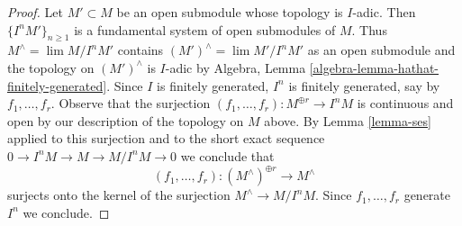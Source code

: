 \documentclass{stacks-project}
\theoremstyle{plain}
\theoremstyle{definition}
\theoremstyle{remark}
\numberwithin{equation}{subsection}
\def\lim{\mathop{\mathrm{lim}}\nolimits}
\begin{document}
\begin{proof}
Let $M' \subset M$ be an open submodule whose topology is $I$-adic.
Then $\{I^nM'\}_{n \geq 1}$ is a fundamental system of open submodules
of $M$. Thus $M^\wedge = \lim M/I^nM'$ contains
$(M')^\wedge = \lim M'/I^nM'$
as an open submodule and the topology on $(M')^\wedge$ is
$I$-adic by Algebra, Lemma \ref{algebra-lemma-hathat-finitely-generated}.
Since $I$ is finitely generated, $I^n$ is finitely generated,
say by $f_1, \ldots, f_r$. Observe that the surjection
$(f_1, \ldots, f_r) : M^{\oplus r} \to I^n M$ is continuous
and open by our description of the topology on $M$ above.
By Lemma \ref{lemma-ses} applied to this surjection and to the
short exact sequence $0 \to I^nM \to M \to M/I^nM \to 0$
we conclude that
$$
(f_1, \ldots, f_r) :
(M^\wedge)^{\oplus r} \longrightarrow M^\wedge
$$
surjects onto the kernel of the surjection $M^\wedge \to M/I^nM$.
Since $f_1, \ldots, f_r$ generate $I^n$ we conclude.
\end{proof}
\end{document}
